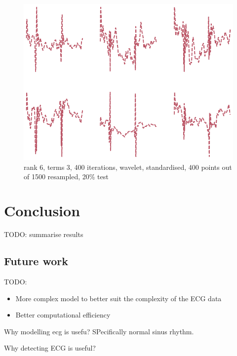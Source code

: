 \documentclass{mldsmsc}
\begin{document}
\begin{figure}[H]
\begin{center}
\includegraphics[scale=1]{images/forecast/periodic_bases.pdf}
\caption{rank 6, terms 3, 400 iterations, wavelet, standardised, 400 points out of 1500 resampled, 20\% test}
\label{bases}
\end{center}
\end{figure}

\chapter{Conclusion}

TODO: summarise results

\section{Future work}

TODO:
\begin{itemize}
    \item More complex model to better suit the complexity of the ECG data
    \item Better computational efficiency
\end{itemize}

Why modelling ecg is usefu? SPecifically normal sinus rhythm.

Why detecting ECG is useful?

\clearpage
\renewcommand*{\thepage}{A\arabic{page}}

\appendix
\end{document}
